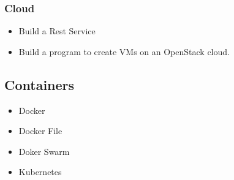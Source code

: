 \subsubsection{Cloud}


\begin{itemize}
\item Build a Rest Service
\item Build a program to create VMs on an OpenStack cloud.
\end{itemize}



\subsection{Containers}

\begin{itemize}
\item Docker 
\item Docker File
\item Doker Swarm
\item Kubernetes
\end{itemize}





